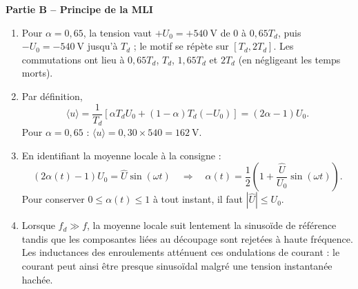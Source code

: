 \documentclass[11pt,a4paper]{article}
\newcommand{\partie}[1]{\vspace{0.7em}\noindent\textbf{\large #1}\par\vspace{0.25em}}
\begin{document}
\partie{Partie B -- Principe de la MLI}
\begin{enumerate}[label=\textbf{B\arabic*.}]
\item Pour $\alpha=0{,}65$, la tension vaut $+U_0=+\SI{540}{\volt}$ de $0$ à $0{,}65T_d$, puis $-U_0=-\SI{540}{\volt}$ jusqu'à $T_d$ ; le motif se répète sur $[T_d,2T_d]$. Les commutations ont lieu à $0{,}65T_d$, $T_d$, $1{,}65T_d$ et $2T_d$ (en négligeant les temps morts).
\begin{center}
\end{center}
\item Par définition,
\[
\langle u\rangle=\frac{1}{T_d}\left[\alpha T_d U_0+(1-\alpha)T_d(-U_0)\right]
=\boxed{(2\alpha-1)U_0}.
\]
Pour $\alpha=0{,}65$ : $\langle u\rangle=0{,}30\times540=\boxed{\SI{162}{\volt}}$.
\item En identifiant la moyenne locale à la consigne :
\[
(2\alpha(t)-1)U_0=\widehat U\sin(\omega t)
\quad\Longrightarrow\quad
\boxed{\alpha(t)=\frac12\left(1+\frac{\widehat U}{U_0}\sin(\omega t)\right)}.
\]
Pour conserver $0\leq\alpha(t)\leq1$ à tout instant, il faut $\boxed{|\widehat U|\leq U_0}$.
\item Lorsque $f_d\gg f$, la moyenne locale suit lentement la sinusoïde de référence tandis que les composantes liées au découpage sont rejetées à haute fréquence. Les inductances des enroulements atténuent ces ondulations de courant : le courant peut ainsi être presque sinusoïdal malgré une tension instantanée hachée.
\end{enumerate}
\end{document}
